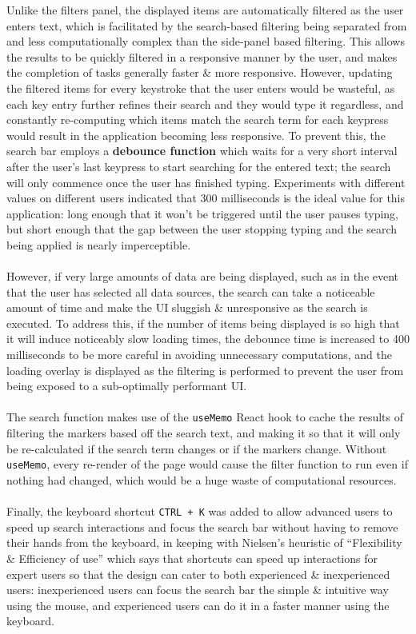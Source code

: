 \documentclass[a4paper,11pt]{report}
\begin{document}
Unlike the filters panel, the displayed items are automatically filtered as the user enters text, which is facilitated by the search-based filtering being separated from and less computationally complex than the side-panel based filtering.
This allows the results to be quickly filtered in a responsive manner by the user, and makes the completion of tasks generally faster \& more responsive.
However, updating the filtered items for every keystroke that the user enters would be wasteful, as each key entry further refines their search and they would type it regardless, and constantly re-computing which items match the search term for each keypress would result in the application becoming less responsive.
To prevent this, the search bar employs a \textbf{debounce function}\supercite{debounce} which waits for a very short interval after the user's last keypress to start searching for the entered text;
the search will only commence once the user has finished typing.
Experiments with different values on different users indicated that 300 milliseconds is the ideal value for this application:
long enough that it won't be triggered until the user pauses typing, but short enough that the gap between the user stopping typing and the search being applied is nearly imperceptible.
\\\\
However, if very large amounts of data are being displayed, such as in the event that the user has selected all data sources, the search can take a noticeable amount of time and make the UI sluggish \& unresponsive as the search is executed.
To address this, if the number of items being displayed is so high that it will induce noticeably slow loading times, the debounce time is increased to 400 milliseconds to be more careful in avoiding unnecessary computations, and the loading overlay is displayed as the filtering is performed to prevent the user from being exposed to a sub-optimally performant UI.
\\\\
The search function makes use of the \texttt{useMemo}\supercite{usememo} React hook to cache the results of filtering the markers based off the search text, and making it so that it will only be re-calculated if the search term changes or if the markers change.
Without \texttt{useMemo}, every re-render of the page would cause the filter function to run even if nothing had changed, which would be a huge waste of computational resources.
\\\\
Finally, the keyboard shortcut \verb|CTRL + K| was added to allow advanced users to speed up search interactions and focus the search bar without having to remove their hands from the keyboard, in keeping with Nielsen's heuristic of ``Flexibility \& Efficiency of use'' which says that shortcuts can speed up interactions for expert users so that the design can cater to both experienced \& inexperienced users:
inexperienced users can focus the search bar the simple \& intuitive way using the mouse, and experienced users can do it in a faster manner using the keyboard.
\end{document}
